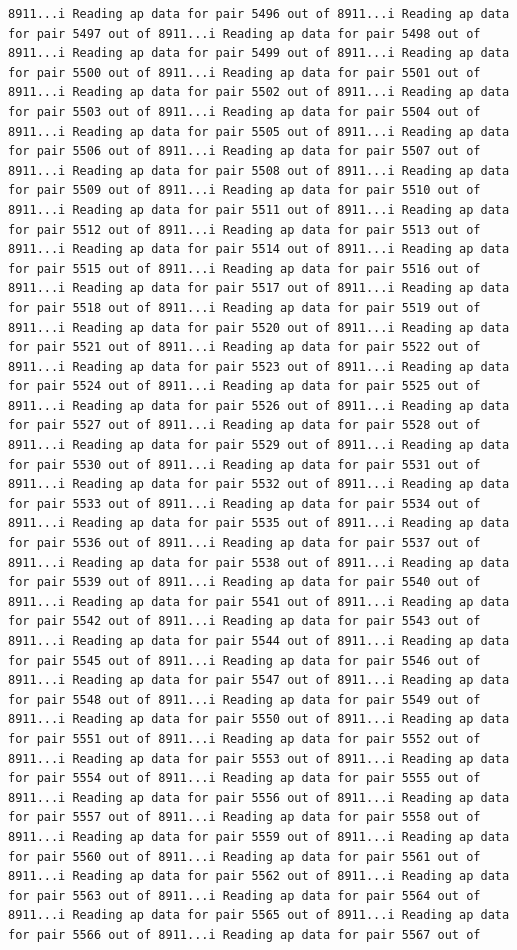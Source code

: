 \documentclass[
]{article}
\begin{document}
\begin{verbatim}
8911...i Reading ap data for pair 5496 out of 8911...i Reading ap data for pair 5497 out of 8911...i Reading ap data for pair 5498 out of 8911...i Reading ap data for pair 5499 out of 8911...i Reading ap data for pair 5500 out of 8911...i Reading ap data for pair 5501 out of 8911...i Reading ap data for pair 5502 out of 8911...i Reading ap data for pair 5503 out of 8911...i Reading ap data for pair 5504 out of 8911...i Reading ap data for pair 5505 out of 8911...i Reading ap data for pair 5506 out of 8911...i Reading ap data for pair 5507 out of 8911...i Reading ap data for pair 5508 out of 8911...i Reading ap data for pair 5509 out of 8911...i Reading ap data for pair 5510 out of 8911...i Reading ap data for pair 5511 out of 8911...i Reading ap data for pair 5512 out of 8911...i Reading ap data for pair 5513 out of 8911...i Reading ap data for pair 5514 out of 8911...i Reading ap data for pair 5515 out of 8911...i Reading ap data for pair 5516 out of 8911...i Reading ap data for pair 5517 out of 8911...i Reading ap data for pair 5518 out of 8911...i Reading ap data for pair 5519 out of 8911...i Reading ap data for pair 5520 out of 8911...i Reading ap data for pair 5521 out of 8911...i Reading ap data for pair 5522 out of 8911...i Reading ap data for pair 5523 out of 8911...i Reading ap data for pair 5524 out of 8911...i Reading ap data for pair 5525 out of 8911...i Reading ap data for pair 5526 out of 8911...i Reading ap data for pair 5527 out of 8911...i Reading ap data for pair 5528 out of 8911...i Reading ap data for pair 5529 out of 8911...i Reading ap data for pair 5530 out of 8911...i Reading ap data for pair 5531 out of 8911...i Reading ap data for pair 5532 out of 8911...i Reading ap data for pair 5533 out of 8911...i Reading ap data for pair 5534 out of 8911...i Reading ap data for pair 5535 out of 8911...i Reading ap data for pair 5536 out of 8911...i Reading ap data for pair 5537 out of 8911...i Reading ap data for pair 5538 out of 8911...i Reading ap data for pair 5539 out of 8911...i Reading ap data for pair 5540 out of 8911...i Reading ap data for pair 5541 out of 8911...i Reading ap data for pair 5542 out of 8911...i Reading ap data for pair 5543 out of 8911...i Reading ap data for pair 5544 out of 8911...i Reading ap data for pair 5545 out of 8911...i Reading ap data for pair 5546 out of 8911...i Reading ap data for pair 5547 out of 8911...i Reading ap data for pair 5548 out of 8911...i Reading ap data for pair 5549 out of 8911...i Reading ap data for pair 5550 out of 8911...i Reading ap data for pair 5551 out of 8911...i Reading ap data for pair 5552 out of 8911...i Reading ap data for pair 5553 out of 8911...i Reading ap data for pair 5554 out of 8911...i Reading ap data for pair 5555 out of 8911...i Reading ap data for pair 5556 out of 8911...i Reading ap data for pair 5557 out of 8911...i Reading ap data for pair 5558 out of 8911...i Reading ap data for pair 5559 out of 8911...i Reading ap data for pair 5560 out of 8911...i Reading ap data for pair 5561 out of 8911...i Reading ap data for pair 5562 out of 8911...i Reading ap data for pair 5563 out of 8911...i Reading ap data for pair 5564 out of 8911...i Reading ap data for pair 5565 out of 8911...i Reading ap data for pair 5566 out of 8911...i Reading ap data for pair 5567 out of 
\end{verbatim}
\end{document}

